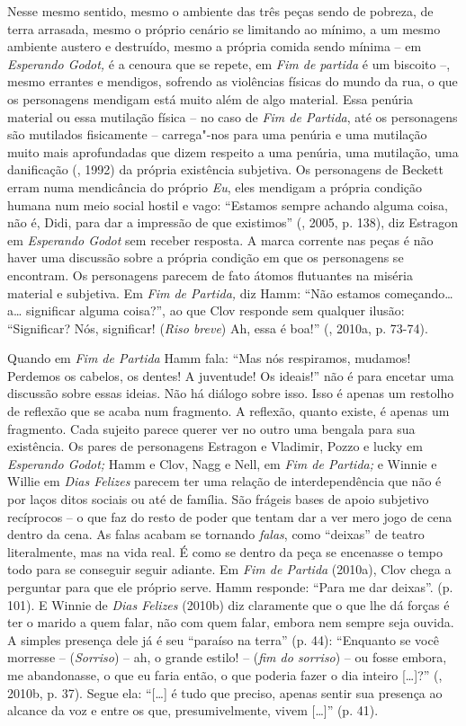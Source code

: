 Nesse mesmo sentido, mesmo o ambiente das três peças sendo de pobreza,
de terra arrasada, mesmo o próprio cenário se limitando ao mínimo, a um
mesmo ambiente austero e destruído, mesmo a própria comida sendo mínima
-- em \emph{Esperando Godot,} é a cenoura que se repete, em \emph{Fim de
partida} é um biscoito --, mesmo errantes e mendigos, sofrendo as
violências físicas do mundo da rua, o que os personagens mendigam está
muito além de algo material. Essa penúria material ou essa mutilação
física -- no caso de \emph{Fim de Partida}, até os personagens são
mutilados fisicamente -- carrega"-nos para uma penúria e uma mutilação
muito mais aprofundadas que dizem respeito a uma penúria, uma mutilação,
uma danificação (, 1992) da própria existência subjetiva. Os
personagens de Beckett erram numa mendicância do próprio \emph{Eu}, eles
mendigam a própria condição humana num meio social hostil e vago:
``Estamos sempre achando alguma coisa, não é, Didi, para dar a impressão
de que existimos'' (, 2005, p. 138), diz Estragon em
\emph{Esperando Godot} sem receber resposta. A marca corrente nas peças
é não haver uma discussão sobre a própria condição em que os personagens
se encontram. Os personagens parecem de fato átomos flutuantes na
miséria material e subjetiva. Em \emph{Fim de Partida,} diz Hamm: ``Não
estamos começando\ldots{} a\ldots{} significar alguma coisa?'', ao que Clov
responde sem qualquer ilusão: ``Significar? Nós, significar! (\emph{Riso
breve}) Ah, essa é boa!'' (, 2010a, p. 73-74).

Quando em \emph{Fim de Partida} Hamm fala: ``Mas nós respiramos,
mudamos! Perdemos os cabelos, os dentes! A juventude! Os ideais!'' não é
para encetar uma discussão sobre essas ideias. Não há diálogo sobre
isso. Isso é apenas um restolho de reflexão que se acaba num fragmento.
A reflexão, quanto existe, é apenas um fragmento. Cada sujeito parece
querer ver no outro uma bengala para sua existência. Os pares de
personagens Estragon e Vladimir, Pozzo e lucky em \emph{Esperando
Godot;} Hamm e Clov, Nagg e Nell, em \emph{Fim de Partida;} e Winnie e
Willie em \emph{Dias Felizes} parecem ter uma relação de
interdependência que não é por laços ditos sociais ou até de família.
São frágeis bases de apoio subjetivo recíprocos -- o que faz do resto de
poder que tentam dar a ver mero jogo de cena dentro da cena. As falas
acabam se tornando \emph{falas}, como ``deixas'' de teatro literalmente,
mas na vida real. É como se dentro da peça se encenasse o tempo todo
para se conseguir seguir adiante. Em \emph{Fim de Partida} (2010a), Clov
chega a perguntar para que ele próprio serve. Hamm responde: ``Para me
dar deixas''. (p. 101). E Winnie de \emph{Dias Felizes} (2010b) diz
claramente que o que lhe dá forças é ter o marido a quem falar, não com
quem falar, embora nem sempre seja ouvida. A simples presença dele já é
seu ``paraíso na terra'' (p. 44): ``Enquanto se você morresse --
(\emph{Sorriso}) -- ah, o grande estilo! -- (\emph{fim do sorriso}) --
ou fosse embora, me abandonasse, o que eu faria então, o que poderia
fazer o dia inteiro [\ldots{}]?'' (, 2010b, p. 37). Segue
ela: ``[\ldots{}] é tudo que preciso, apenas sentir sua presença ao
alcance da voz e entre os que, presumivelmente, vivem [\ldots{}]'' (p.
41).

